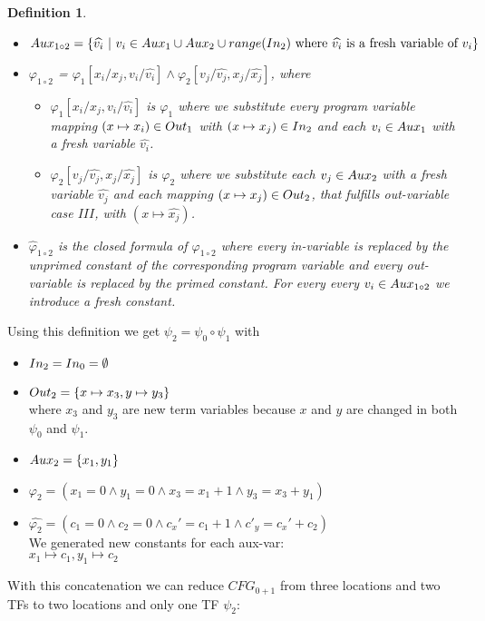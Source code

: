 \documentclass{article}
\newtheorem{mydef}{Definition}
\begin{document}
\begin{mydef}
\begin{itemize}
			\item $Aux_{1 \circ 2} = \{ \widehat{v_i} \ |\ v_i \in Aux_1 \cup Aux_2 \cup range(In_2) \text{ where } \widehat{v_i} \text{ is a fresh variable of } v_i \}$
			\item $\varphi_{1 \circ 2}$ = $\varphi_1[x_i / x_j, v_i / \widehat{v_i} ] \land \varphi_2[v_j / \widehat{v_j}, x_j / \widehat{x_j}]$, where
			 \begin{itemize}
				\item $\varphi_1[x_i / x_j, v_i / \widehat{v_i} ] $ is $\varphi_1$ where we substitute every program variable mapping $(x \mapsto x_i) \in Out_1$ with $(x \mapsto x_j) \in In_2$ and each $v_i \in Aux_1$ with a fresh variable $\widehat{v_i}$.
				\item  $\varphi_2[v_j / \widehat{v_j}, x_j / \widehat{x_j}]$ is $\varphi_2$ where we substitute each $v_j \in Aux_2$ with a fresh variable $\widehat{v_j}$ and each mapping $(x \mapsto x_j) \in Out_2$, that fulfills out-variable case $III$, with $(x \mapsto \widehat{x_j})$.
			\end{itemize} 
			
			\item $\widehat{\varphi}_{1 \circ 2}$ is the closed formula of $\varphi_{1 \circ 2}$ where every in-variable is replaced by the unprimed constant of the corresponding program variable and every out-variable is replaced by the primed constant. For every every $v_i \in Aux_{1 \circ 2}$ we introduce a fresh constant.
		\end{itemize}
	\end{mydef}

	\smallskip
	Using this definition we get $\psi_2 = \psi_0 \circ \psi_1$ with
	\begin{itemize}
		\item $In_2 = In_0 = \emptyset$
		\item $Out_2 = \{ x \mapsto x_3, y \mapsto y_3 \}$ \\ where $x_3$ and $y_3$ are new term variables because $x$ and $y$ are changed in both $\psi_0$ and $\psi_1$.
		\item $Aux_2 = \{x_1, y_1 \} $
		\item $\varphi_2 = (x_1 = 0 \land y_1 = 0 \land x_3 = x_1 + 1 \land y_3 = x_3 + y_1)$
		\item $\widehat{\varphi_2} = (c_1 = 0 \land c_2 = 0 \land c_x' = c_1 + 1 \land c'_y = c_x' + c_2)$ \\ We generated new constants for each aux-var: \\
		$x_1 \mapsto c_1, y_1 \mapsto c_2$
	\end{itemize}
	With this concatenation we can reduce $CFG_{0+1}$ from three locations and two TFs to two locations and only one TF $\psi_2$: \\
	
\end{document}
